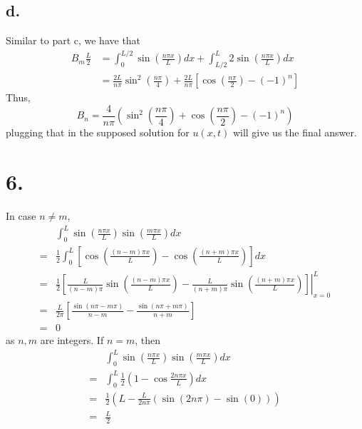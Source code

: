 \documentclass[11pt]{article}
\theoremstyle{mystyle}
\theoremstyle{definition}
\begin{document}
\subsection*{d.}
Similar to part c, we have that 
\begin{align*}
  B_m \displaystyle\frac{L}{2} &= \int_0^{L/2} \sin\left(\displaystyle\frac{n\pi x }{L} \right) dx + \int_{L/2}^L 2\sin\left(\displaystyle\frac{n\pi x }{L} \right) dx \\
  &= \displaystyle\frac{2L}{n\pi} \sin^2 \left( \displaystyle\frac{n\pi}{4}\right) + \displaystyle\frac{2L}{n\pi} \left[\cos\left( \displaystyle\frac{n\pi}{2}\right) - (-1)^n\right]
\end{align*}
Thus, 
\[
  B_n = \displaystyle\frac{4}{n\pi} \left(\sin^2\left(\displaystyle\frac{n\pi}{4}\right) + \cos\left(\displaystyle\frac{n\pi}{2}\right) -(-1)^n \right)
\]
plugging that in the supposed solution for $u(x,t)$ will give us the final answer.
\newpage
\section*{6.}
In case $n\ne m$, 
\begin{align*}
  &\int_0^L \sin\left(\displaystyle\frac{n\pi x}{L}\right)
  \sin\left(\displaystyle\frac{m\pi x}{L}\right) dx \\
  =& \displaystyle\frac{1}{2} \int_0^L \left[\cos\left(\displaystyle\frac{(n-m)\pi x}{L} \right) - \cos\left(\displaystyle\frac{(n+m)\pi x}{L} \right) \right] dx \\
  =& \displaystyle\frac{1}{2} \left. \left[\displaystyle\frac{L}{(n-m)\pi} \sin\left(\displaystyle\frac{(n-m)\pi x}{L} \right) - \displaystyle\frac{L}{(n+m)\pi}\sin\left(\displaystyle\frac{(n+m)\pi x}{L} \right) \right] \right|_{x=0}^L \\
  =& \displaystyle\frac{L}{2\pi} \left[\displaystyle\frac{\sin(n\pi - m\pi)}{n-m}- \displaystyle\frac{\sin(n\pi + m\pi)}{n+m}\right] \\
  =& 0 
\end{align*}
as $n, m$ are integers. If $n = m$, then 
\begin{align*}
  &\int_0^L \sin\left(\displaystyle\frac{n\pi x}{L}\right) 
  \sin\left(\displaystyle\frac{m\pi x}{L}\right) dx \\
  =& \int_0^L \displaystyle\frac{1}{2} \left(1 - \cos \displaystyle\frac{2n\pi x}{L} \right) dx\\
  =& \displaystyle\frac{1}{2} \left(L - \displaystyle\frac{L}{2n\pi} (\sin(2n\pi) - \sin(0))\right) \\
  =& \displaystyle\frac{L}{2}
\end{align*}
\newpage
\end{document}
